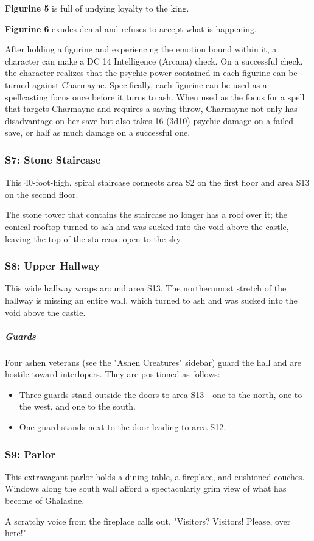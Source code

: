 \documentclass[10pt,a4paper,twoside,bg=print,twocolumn,openany,nodeprecatedcode]{dndbook}
\begin{document}
\textbf{Figurine 5} is full of undying loyalty to the king.

\textbf{Figurine 6} exudes denial and refuses to accept what is happening.

After holding a figurine and experiencing the emotion bound within it, a character can make a DC 14 Intelligence (Arcana) check. On a successful check, the character realizes that the psychic power contained in each figurine can be turned against Charmayne. Specifically, each figurine can be used as a spellcasting focus once before it turns to ash. When used as the focus for a spell that targets Charmayne and requires a saving throw, Charmayne not only has disadvantage on her save but also takes 16 (3d10) psychic damage on a failed save, or half as much damage on a successful one.

\subsubsection{S7: Stone Staircase}
This 40-foot-high, spiral staircase connects area S2 on the first floor and area S13 on the second floor.

The stone tower that contains the staircase no longer has a roof over it; the conical rooftop turned to ash and was sucked into the void above the castle, leaving the top of the staircase open to the sky.

\subsubsection{S8: Upper Hallway}
This wide hallway wraps around area S13. The northernmost stretch of the hallway is missing an entire wall, which turned to ash and was sucked into the void above the castle.

\subparagraph{Guards}
Four ashen veterans (see the "Ashen Creatures" sidebar) guard the hall and are hostile toward interlopers. They are positioned as follows:


\begin{itemize}
\item Three guards stand outside the doors to area S13—one to the north, one to the west, and one to the south.
\item One guard stands next to the door leading to area S12.
\end{itemize}

\subsubsection{S9: Parlor}
\begin{DndReadAloud}{}
This extravagant parlor holds a dining table, a fireplace, and cushioned couches. Windows along the south wall afford a spectacularly grim view of what has become of Ghalasine.

A scratchy voice from the fireplace calls out, "Visitors? Visitors! Please, over here!"

\end{DndReadAloud}
\end{document}
